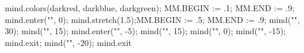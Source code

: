 \usemodule[mindmap]
\startMPpage
mind.colors(darkred, darkblue, darkgreen);
MM.BEGIN := .1; MM.END := .9;
mind.enter("", 0);
  mind.stretch(1.5);MM.BEGIN := .5; MM.END := .9;
  mind("", 30);
  mind("", 15);
  mind.enter("", -5);
    mind("", 15);
    mind("", 0);
    mind("", -15);
  mind.exit;
  mind("", -20);
mind.exit
\stopMPpage
